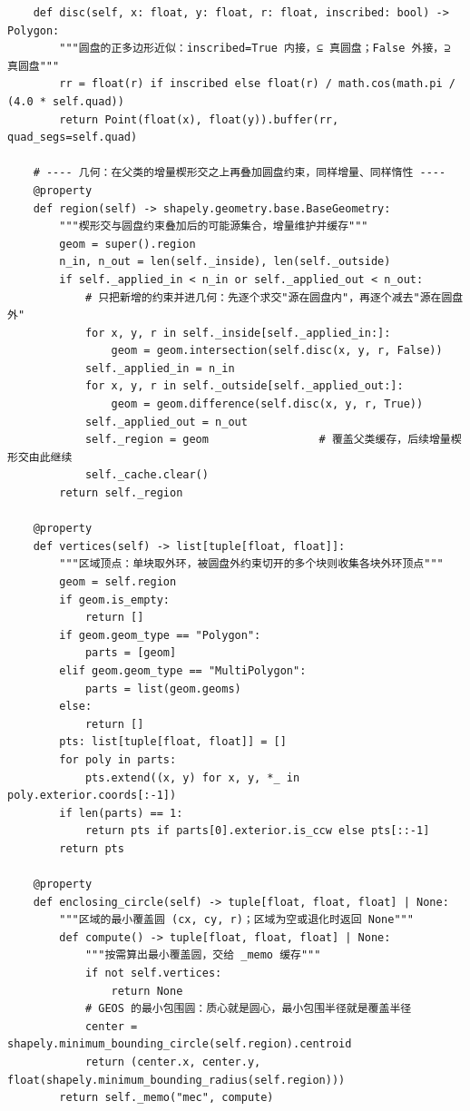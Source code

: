 \documentclass[UTF8, zihao=5,AutoFakeBold=2]{ctexart}
\begin{document}
\begin{lstlisting}
    def disc(self, x: float, y: float, r: float, inscribed: bool) -> Polygon:
        """圆盘的正多边形近似：inscribed=True 内接，⊆ 真圆盘；False 外接，⊇ 真圆盘"""
        rr = float(r) if inscribed else float(r) / math.cos(math.pi / (4.0 * self.quad))
        return Point(float(x), float(y)).buffer(rr, quad_segs=self.quad)

    # ---- 几何：在父类的增量楔形交之上再叠加圆盘约束，同样增量、同样惰性 ----
    @property
    def region(self) -> shapely.geometry.base.BaseGeometry:
        """楔形交与圆盘约束叠加后的可能源集合，增量维护并缓存"""
        geom = super().region
        n_in, n_out = len(self._inside), len(self._outside)
        if self._applied_in < n_in or self._applied_out < n_out:
            # 只把新增的约束并进几何：先逐个求交"源在圆盘内"，再逐个减去"源在圆盘外"
            for x, y, r in self._inside[self._applied_in:]:
                geom = geom.intersection(self.disc(x, y, r, False))
            self._applied_in = n_in
            for x, y, r in self._outside[self._applied_out:]:
                geom = geom.difference(self.disc(x, y, r, True))
            self._applied_out = n_out
            self._region = geom                 # 覆盖父类缓存，后续增量楔形交由此继续
            self._cache.clear()
        return self._region

    @property
    def vertices(self) -> list[tuple[float, float]]:
        """区域顶点：单块取外环，被圆盘外约束切开的多个块则收集各块外环顶点"""
        geom = self.region
        if geom.is_empty:
            return []
        if geom.geom_type == "Polygon":
            parts = [geom]
        elif geom.geom_type == "MultiPolygon":
            parts = list(geom.geoms)
        else:
            return []
        pts: list[tuple[float, float]] = []
        for poly in parts:
            pts.extend((x, y) for x, y, *_ in poly.exterior.coords[:-1])
        if len(parts) == 1:
            return pts if parts[0].exterior.is_ccw else pts[::-1]
        return pts

    @property
    def enclosing_circle(self) -> tuple[float, float, float] | None:
        """区域的最小覆盖圆 (cx, cy, r)；区域为空或退化时返回 None"""
        def compute() -> tuple[float, float, float] | None:
            """按需算出最小覆盖圆，交给 _memo 缓存"""
            if not self.vertices:
                return None
            # GEOS 的最小包围圆：质心就是圆心，最小包围半径就是覆盖半径
            center = shapely.minimum_bounding_circle(self.region).centroid
            return (center.x, center.y, float(shapely.minimum_bounding_radius(self.region)))
        return self._memo("mec", compute)


\end{lstlisting}
\end{document}
